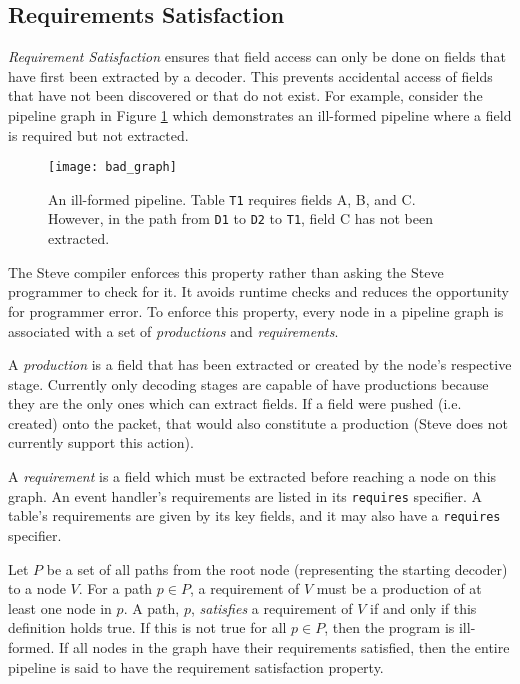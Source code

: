 \subsection{Requirements Satisfaction} \label{guide:requirements}

\textit{Requirement Satisfaction} ensures that field access can only be done on fields that have first been extracted by a decoder. This prevents accidental access of fields that have not been discovered or that do not exist. For example, consider the pipeline graph in Figure \ref{fig:bad_graph} which demonstrates an ill-formed pipeline where a field is required but not extracted.

\begin{figure}[ht]
\texttt{[image: bad\_graph]}
\caption{An ill-formed pipeline. Table \texttt{T1} requires fields A, B, and C. However, in the path from \texttt{D1} to \texttt{D2} to \texttt{T1}, field C has not been extracted.}
\label{fig:bad_graph}
\end{figure}

The Steve compiler enforces this
property rather than asking the Steve programmer to check for it.
It avoids runtime checks and reduces the opportunity for programmer error.
To enforce this property, 
every node in a pipeline graph is associated with a set of \textit{productions} and \textit{requirements}.

A \textit{production} is a field that has been extracted or created by the node's respective stage. Currently only decoding stages are capable of have productions because they are the only ones which can extract fields. If a field were pushed (i.e. created) onto the packet, that would also constitute a production (Steve does not currently support this action).

A \emph{requirement} is a field which must be extracted before reaching a node on
this graph. An event handler's requirements are listed in its
\texttt{requires} specifier. A table's requirements are given by its
key fields, and it may also have a \texttt{requires} specifier.

Let $P$ be a set of all paths from the root node (representing the starting decoder) to a node $V$.
For a path $p \in P$, a requirement of $V$ must be a production of at least one node in
$p$. A path, $p$, \emph{satisfies} a requirement of $V$ if and only if this
definition holds true. If this is not true for all $p \in P$, then the program
is ill-formed. If all nodes in the graph have their requirements
satisfied, then the entire pipeline is said to have the requirement
satisfaction property.

